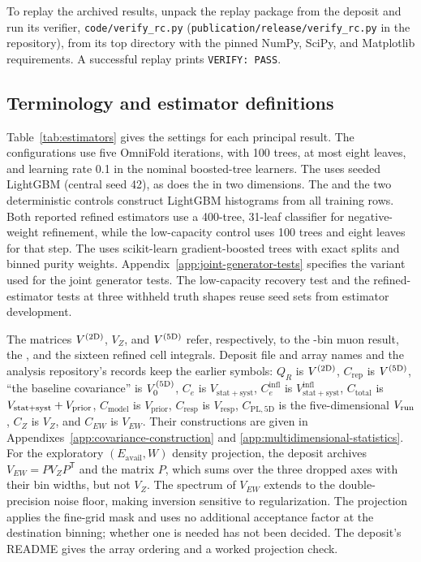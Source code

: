\begin{sloppypar}
To replay the archived results, unpack the replay package from the deposit and run its verifier, \texttt{code/\allowbreak verify\_rc.py} (\texttt{publication/\allowbreak release/\allowbreak verify\_rc.py} in the repository), from its top directory with the pinned NumPy, SciPy, and Matplotlib requirements. A successful replay prints \verb|VERIFY: PASS|.
\end{sloppypar}

\subsection{Terminology and estimator definitions}
\label{app:reproducibility-definitions}
\label{sec:front-definitions}
\label{app:devhistory-method}
\label{app:devhistory-seeds}
\label{app:devhistory-5d}
\label{app:devhistory-recovery-seeds}

Table~\ref{tab:estimators} gives the settings for each principal result. The configurations use five OmniFold iterations, with 100 trees, at most eight leaves, and learning rate 0.1 in the nominal boosted-tree learners. The \estTwoD{} uses seeded LightGBM (central seed 42), as does the \estPurity{} in two dimensions. The \estMultiD{} and the two deterministic controls construct LightGBM histograms from all training rows. Both reported refined estimators use a 400-tree, 31-leaf classifier for negative-weight refinement, while the low-capacity control uses 100 trees and eight leaves for that step. The \estExact{} uses scikit-learn gradient-boosted trees with exact splits and binned purity weights. Appendix~\ref{app:joint-generator-tests} specifies the variant used for the joint generator tests. The low-capacity recovery test and the refined-estimator tests at three withheld truth shapes reuse seed sets from estimator development.

The matrices $V^{(2\mathrm{D})}$, $V_Z$, and $V^{(5\mathrm{D})}$ refer, respectively, to the -bin muon result, the \resFiveAxis{}, and the sixteen refined cell integrals. Deposit file and array names and the analysis repository's records keep the earlier symbols: $Q_R$ is $V^{(2\mathrm{D})}$, $C_{\mathrm{rep}}$ is $V^{(5\mathrm{D})}$, ``the baseline covariance'' is $V_0^{(5\mathrm{D})}$, $C_e$ is $V_{\mathrm{stat+syst}}$, $C_e^{\mathrm{infl}}$ is $V_{\mathrm{stat+syst}}^{\mathrm{infl}}$, $C_{\mathrm{total}}$ is $V_{\mathrm{stat+syst}}+V_{\mathrm{prior}}$, $C_{\mathrm{model}}$ is $V_{\mathrm{prior}}$, $C_{\mathrm{resp}}$ is $V_{\mathrm{resp}}$, $C_{\mathrm{PL,5D}}$ is the five-dimensional $V_{\mathrm{run}}$, $C_Z$ is $V_Z$, and $C_{EW}$ is $V_{EW}$. Their constructions are given in Appendixes~\ref{app:covariance-construction} and \ref{app:multidimensional-statistics}. For the exploratory $(E_{\mathrm{avail}},W)$ density projection, the deposit archives $V_{EW}=PV_ZP^{\mathsf T}$ and the matrix $P$, which sums over the three dropped axes with their bin widths, but not $V_Z$. The spectrum of $V_{EW}$ extends to the double-precision noise floor, making inversion sensitive to regularization. The projection applies the fine-grid mask and uses no additional acceptance factor at the destination binning; whether one is needed has not been decided. The deposit's README gives the array ordering and a worked projection check.


